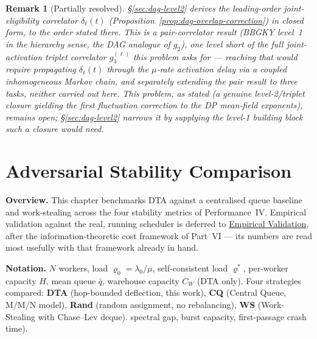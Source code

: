 \documentclass[11pt,a4paper]{report}
\newtheorem{remark}{Remark}[section]
\begin{document}
\begin{remark}[Partially resolved]
\S\ref{sec:dag-level2} derives the leading-order joint-\emph{eligibility}
correlator $\delta_\ell(t)$ (Proposition~\ref{prop:dag-overlap-correction})
in closed form, to the order stated there. This is a \emph{pair}-correlator
result (BBGKY level~1 in the hierarchy sense, the DAG analogue of
$g_2$), one level short of the full joint-\emph{activation} triplet
correlator $g_3^{(\ell)}$ this problem asks for --- reaching that would
require propagating $\delta_\ell(t)$ through the $\mu$-rate activation
delay via a coupled inhomogeneous Markov chain, and separately
extending the pair result to three tasks, neither carried out here.
This problem, as stated (a genuine level-2/triplet closure yielding
the first fluctuation correction to the DP mean-field exponents),
remains open; \S\ref{sec:dag-level2} narrows it by supplying the
level-1 building block such a closure would need.
\end{remark}


\chapter{Adversarial Stability Comparison}
\label{chap:stability_compare}

\bigskip
\noindent\textbf{Overview.}
This chapter benchmarks DTA against a centralised queue baseline and
work-stealing across the four stability metrics of Performance~IV.
Empirical validation against the real, running scheduler is deferred
to \hyperref[chap:empirical_validation]{Empirical Validation}, after
the information-theoretic cost framework of Part~VI --- its numbers
are read most usefully with that framework already in hand.

\textbf{Notation.}
$N$ workers, load $\varrho_0 = \lambda_0/\mu$, self-consistent load $\varrho^*$,
per-worker capacity $H$, mean queue $\bar q$, warehouse capacity $C_W$
(DTA only).
Four strategies compared: \textbf{DTA} (hop-bounded deflection, this work),
\textbf{CQ} (Central Queue, M/M/N model), \textbf{Rand} (random assignment,
no rebalancing), \textbf{WS} (Work-Stealing with Chase--Lev deque).
spectral gap, burst capacity, first-passage crash time).

\end{document}
